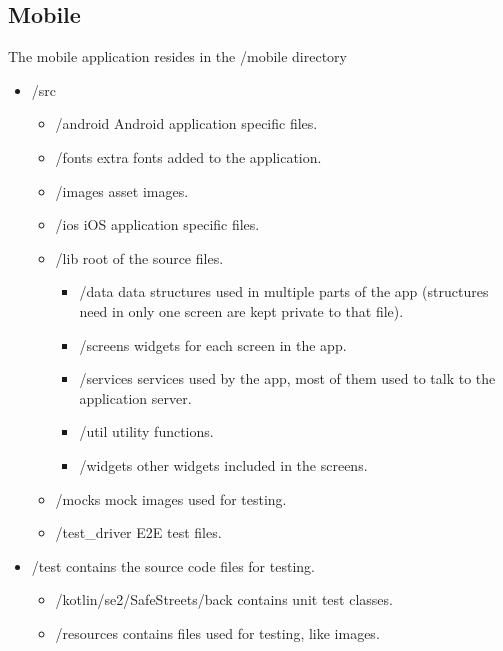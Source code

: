 \subsection{Mobile}
The mobile application resides in the /mobile directory

\begin{itemize}
    \item 
    /src
    \begin{itemize}[label={$\diamond$}]
        \item 
        /android \textcolor{black!70}{Android application specific files.}
        \item 
        /fonts \textcolor{black!70}{extra fonts added to the application.}
        \item 
        /images \textcolor{black!70}{asset images.}
        \item 
        /ios \textcolor{black!70}{iOS application specific files.}
        \item 
        /lib \textcolor{black!70}{root of the source files.}
        \begin{itemize}[label={\textbf{-}}]
            \item 
            /data \textcolor{black!70}{data structures used in multiple parts of the app (structures need in only one screen are kept private to that file).}
            \item 
            /screens \textcolor{black!70}{widgets for each screen in the app.}
            \item 
            /services \textcolor{black!70}{services used by the app, most of them used to talk to the application server.}
            \item 
            /util \textcolor{black!70}{utility functions.}
            \item 
            /widgets \textcolor{black!70}{other widgets included in the screens.}
        \end{itemize}
        \item 
        /mocks \textcolor{black!70}{mock images used for testing.}
        \item 
        /test\_driver \textcolor{black!70}{E2E test files.}
    \end{itemize}

    \item 
    /test \textcolor{black!70}{contains the source code files for testing.}
    \begin{itemize}[label={$\diamond$}]
        \item 
        /kotlin/se2/SafeStreets/back \textcolor{black!70}{contains unit test classes.}
        \item 
        /resources \textcolor{black!70}{contains files used for testing, like images.}
    \end{itemize}
\end{itemize}

